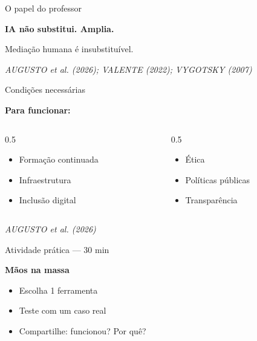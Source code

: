 \documentclass[11pt]{beamer}
\newcommand{\citabnt}[1]{%
	\vfill
	\begin{flushright}
		\tiny\textit{#1}
	\end{flushright}
}
\begin{document}
	\begin{frame}{O papel do professor}
		\begin{center}
			\Large
			\textbf{IA não substitui. Amplia.}
		\end{center}
		\vspace{1em}
		\begin{center}
			Mediação humana é insubstituível.
		\end{center}
		\citabnt{AUGUSTO et al. (2026); VALENTE (2022); VYGOTSKY (2007)}
	\end{frame}
	
	\begin{frame}{Condições necessárias}
		\begin{center}
			\Large \textbf{Para funcionar:}
		\end{center}
		\vspace{1em}
		\begin{columns}[T]
			\begin{column}{0.5\textwidth}
				\begin{itemize}
					\item Formação continuada
					\item Infraestrutura
					\item Inclusão digital
				\end{itemize}
			\end{column}
			\begin{column}{0.5\textwidth}
				\begin{itemize}
					\item Ética
					\item Políticas públicas
					\item Transparência
				\end{itemize}
			\end{column}
		\end{columns}
		\citabnt{AUGUSTO et al. (2026)}
	\end{frame}
	
	\begin{frame}{Atividade prática — 30 min}
		\begin{center}
			\Large \textbf{Mãos na massa}
		\end{center}
		\vspace{1.5em}
		\begin{itemize}
			\item Escolha 1 ferramenta
			\item Teste com um caso real
			\item Compartilhe: funcionou? Por quê?
		\end{itemize}
	\end{frame}
	
\end{document}
